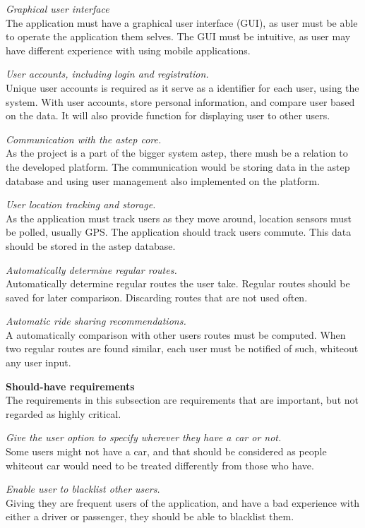 \textit{Graphical user interface}\\
The application must have a graphical user interface (GUI), as user must be able to operate the application them selves. 
The GUI must be intuitive, as user may have different experience with using mobile applications.

\textit{User accounts, including login and registration.}\\
Unique user accounts is required as it serve as a identifier for each user, using the system. With user accounts, store personal information, and compare user based on the data. 
It will also provide function for displaying user to other users.

\textit{Communication with the \gls{astep} core.}\\
As the project is a part of the bigger system \gls{astep}, there mush be a relation to the developed platform. 
The communication would be storing data in the \gls{astep} database and using user management also implemented on the platform.

\textit{User location tracking and storage.}\\
As the application must track users as they move around, location sensors must be polled, usually GPS. 
The application should track users commute.
This data should be stored in the \gls{astep} database.

\textit{Automatically determine regular routes.}\\
Automatically determine regular routes the user take. 
Regular routes should be saved for later comparison. 
Discarding routes that are not used often.

\textit{Automatic ride sharing recommendations.}\\
A automatically comparison with other users routes must be computed. When two regular routes are found similar, each user must be notified of such, whiteout any user input.


\textbf{Should-have requirements}\\
The requirements in this subsection are requirements that are important, but not regarded as highly critical.

\textit{Give the user option to specify wherever they have a car or not.}\\
Some users might not have a car, and that should be considered as people whiteout car would need to be treated differently from those who have.

\textit{Enable user to blacklist other users.}\\
Giving they are frequent users of the application, and have a bad experience with either a driver or passenger, they should be able to blacklist them.

